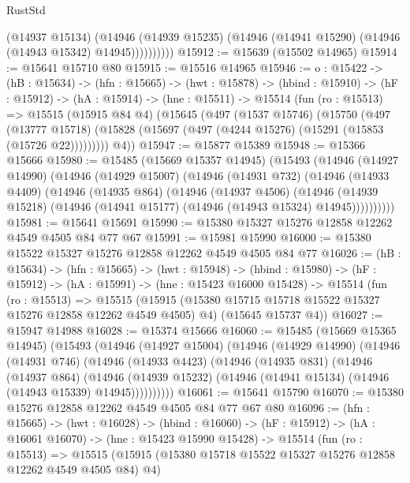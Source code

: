 \begin{lexlean}{RustStd}
\begin{coremodule}
                  (@14937 @15134)
                  (@14946
                    (@14939 @15235)
                    (@14946 (@14941 @15290) (@14946 (@14943 @15342) @14945))))))))))
@15912 := @15639 (@15502 @14965)
@15914 := @15641 @15710 @80
@15915 := @15516 @14965
@15946 := {o : @15422} ->
  (hB : @15634) ->
  (hfn : @15665) ->
  (hwt : @15878) ->
  (hbind : @15910) ->
  (hF : @15912) ->
  (hA : @15914) ->
  (hne : @15511) ->
  @15514
    (fun (ro : @15513) =>
    @15515
      (@15915 @84 @4)
      (@15645
        (@497
          (@1537 @15746)
          (@15750
            (@497
              (@13777 @15718)
              (@15828 (@15697 (@497 (@4244 @15276) (@15291 (@15853 (@15726 @22)))))))))
        @4))
@15947 := @15877 @15389
@15948 := @15366 @15666
@15980 := @15485
    (@15669 @15357 @14945)
    (@15493
      (@14946
        (@14927 @14990)
        (@14946
          (@14929 @15007)
          (@14946
            (@14931 @732)
            (@14946
              (@14933 @4409)
              (@14946
                (@14935 @864)
                (@14946
                  (@14937 @4506)
                  (@14946
                    (@14939 @15218)
                    (@14946 (@14941 @15177) (@14946 (@14943 @15324) @14945))))))))))
@15981 := @15641 @15691
@15990 := @15380 @15327 @15276 @12858 @12262 @4549 @4505 @84 @77 @67
@15991 := @15981 @15990
@16000 := @15380 @15522 @15327 @15276 @12858 @12262 @4549 @4505 @84 @77
@16026 := (hB : @15634) ->
  (hfn : @15665) ->
  (hwt : @15948) ->
  (hbind : @15980) ->
  (hF : @15912) ->
  (hA : @15991) ->
  (hne : @15423 @16000 @15428) ->
  @15514
    (fun (ro : @15513) =>
    @15515
      (@15915 (@15380 @15715 @15718 @15522 @15327 @15276 @12858 @12262 @4549 @4505) @4)
      (@15645 @15737 @4))
@16027 := @15947 @14988
@16028 := @15374 @15666
@16060 := @15485
    (@15669 @15365 @14945)
    (@15493
      (@14946
        (@14927 @15004)
        (@14946
          (@14929 @14990)
          (@14946
            (@14931 @746)
            (@14946
              (@14933 @4423)
              (@14946
                (@14935 @831)
                (@14946
                  (@14937 @864)
                  (@14946
                    (@14939 @15232)
                    (@14946 (@14941 @15134) (@14946 (@14943 @15339) @14945))))))))))
@16061 := @15641 @15790
@16070 := @15380 @15276 @12858 @12262 @4549 @4505 @84 @77 @67 @80
@16096 := (hfn : @15665) ->
  (hwt : @16028) ->
  (hbind : @16060) ->
  (hF : @15912) ->
  (hA : @16061 @16070) ->
  (hne : @15423 @15990 @15428) ->
  @15514
    (fun (ro : @15513) =>
    @15515
      (@15915 (@15380 @15718 @15522 @15327 @15276 @12858 @12262 @4549 @4505 @84) @4)

\end{coremodule}
\end{lexlean}
